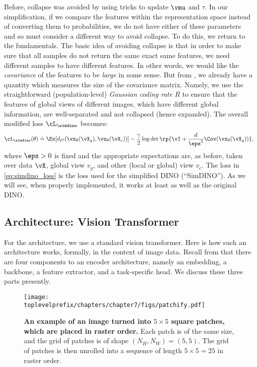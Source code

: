 \documentclass[../../book-main.tex]{subfiles}
\begin{document}
Before, collapse was avoided by using tricks to update \(\vmu\) and \(\tau\). In our simplification, if we compare the features within the representation space instead of converting them to probabilities, we do not have either of these parameters and so must consider a different way to avoid collapse. To do this, we return to the fundamentals. The basic idea of avoiding collapse is that in order to make sure that all samples do not return the same exact same features, we need different samples to have different features. In other words, we would like the \textit{covariance} of the features to be \textit{large} in some sense. But from , we already have a quantity which measures the size of the covariance matrix. Namely, we use the straightforward (population-level) \textit{Gaussian coding rate} \(R\) to ensure that the features of global views of different images, which have different global information, are well-separated and not collapsed (hence expanded). The overall modified loss \(\cL_{\simdino}\) becomes:
\begin{equation}\label{eq:simdino_loss}
    \cL_{\simdino}(\theta) \doteq \Ex[d_{\ell^{2}}(\vz_{\theta}(\vX_{g}),
    \vz_{\theta}(\vX_{c}))] - \frac{\gamma}{2}\log\det\rp{\vI + \frac{d}{\eps^{2}}\Cov(\vz_{\theta}(\vX_{g}))},
\end{equation}
where \(\eps > 0\) is fixed and the appropriate expectations are, as before, taken over data \(\vX\), global view \(v_{g}\), and other (local or global) view \(v_{c}\). The loss in \eqref{eq:simdino_loss} is the loss used for the simplified DINO (``SimDINO''). As we will see, when properly implemented, it works at least as well as the original DINO.

\subsection{Architecture: Vision Transformer}\label{sub:contrastive_learning_architecture}

For the architecture, we use a standard vision transformer. Here is how such an architecture works, formally, in the context of image data. Recall from  that there are four components to an encoder architecture, namely an embedding, a backbone, a feature extractor, and a task-specific head. We discuss these three parts presently.

\begin{figure}
    \centering 
    \texttt{[image: \\toplevelprefix/chapters/chapter7/figs/patchify.pdf]}
    \caption{\small\textbf{An example of an image turned into \(5 \times 5\) square patches, which are placed in raster order.} Each patch is of the same size, and the grid of patches is of shape \((N_{H}, N_{W}) = (5, 5)\). The grid of patches is then unrolled into a sequence of length \(5 \times 5 = 25\) in raster order.}
    \label{fig:patchify_rasterize}
\end{figure}
\end{document}
